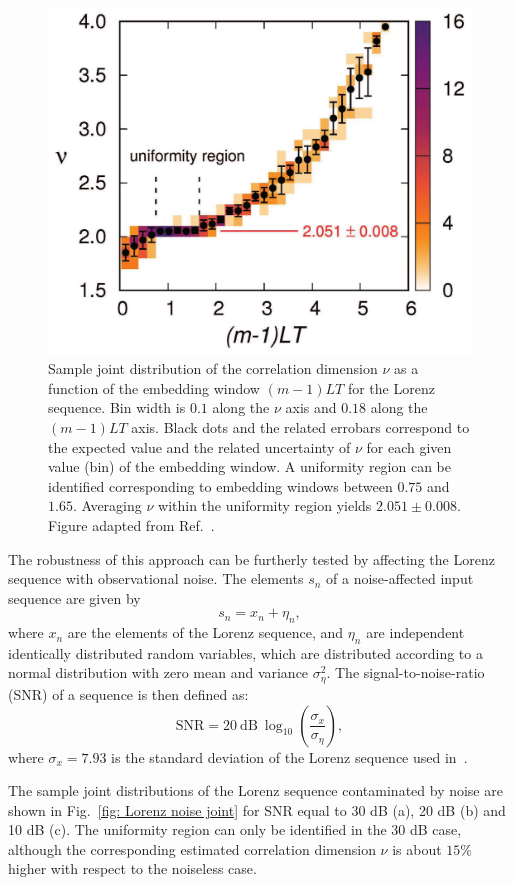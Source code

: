 \begin{figure}[!htbp]
    \centering
    \includegraphics[width=.6\linewidth]{images/joint_Lorenz.png}
    \caption{Sample joint distribution of the correlation dimension $\nu$ as a function of the
    embedding window $(m-1)LT$ for the Lorenz sequence. Bin width is $0.1$ along the $\nu$ axis and
    $0.18$ along the $(m-1)LT$ axis.
    Black dots and the related errobars correspond to the expected value and the related uncertainty of
    $\nu$ for each given value (bin) of the embedding window. A uniformity region can be identified
    corresponding to embedding windows between $0.75$ and $1.65$. Averaging $\nu$ within
    the uniformity region yields $2.051 \pm 0.008$.
    Figure adapted from Ref.~\cite{ref:perinelli2020chasing}.
    }\label{fig: Lorenz joint}
\end{figure}

The robustness of this approach can be furtherly tested by affecting the Lorenz sequence with
observational noise. The elements $s_n$ of a noise-affected input sequence are given by
\begin{equation}
    \label{eq: noise sequence}
    s_n=x_n+\eta_n,
\end{equation}
where $x_n$ are the elements of the Lorenz sequence, and $\eta_n$ are independent
identically distributed random variables, which are distributed according to a normal distribution
with zero mean and variance $\sigma_\eta^2$.
The signal-to-noise-ratio (SNR) of a sequence is then defined as:
\begin{equation}
    \label{eq: snr}
    \text{SNR}= 20~\text{dB}~\log_{10}\left(\frac{\sigma_x}{\sigma_\eta}\right),
\end{equation}
where $\sigma_x=7.93$ is the standard deviation of the Lorenz sequence used in~\cite{ref:perinelli2020chasing}.

The sample joint distributions of the Lorenz sequence contaminated by noise are shown in Fig.~\ref{fig: Lorenz noise joint}
for SNR equal to 30 dB (a), 20 dB (b) and 10 dB (c).
The uniformity region can only be identified in the 30 dB case, although the corresponding estimated
correlation dimension $\nu$ is about $15\%$ higher with respect to the noiseless case.

